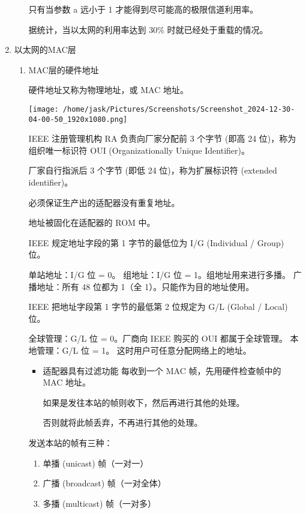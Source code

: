 \documentclass[11pt]{article}
\begin{document}
\begin{enumerate}
\begin{itemize}
只有当参数 a 远小于 1 才能得到尽可能高的极限信道利用率。

据统计，当以太网的利用率达到 30\% 时就已经处于重载的情况。
\end{itemize}
\item 以太网的MAC层
\label{sec:orged552ad}

\begin{enumerate}
\item MAC层的硬件地址
\label{sec:org51e318a}

硬件地址又称为物理地址，或 MAC 地址。 

\begin{center}
\texttt{[image: /home/jask/Pictures/Screenshots/Screenshot\_2024-12-30-04-00-50\_1920x1080.png]}
\end{center}

IEEE 注册管理机构 RA 负责向厂家分配前 3 个字节 (即高 24 位)，称为组织唯一标识符 OUI (Organizationally Unique Identifier)。

厂家自行指派后 3 个字节 (即低 24 位)，称为扩展标识符 (extended identifier)。

必须保证生产出的适配器没有重复地址。

地址被固化在适配器的 ROM 中。

IEEE 规定地址字段的第 1 字节的最低位为 I/G (Individual / Group) 位。

单站地址：I/G 位 = 0。
组地址：I/G 位 = 1。组地址用来进行多播。
广播地址：所有 48 位都为 1（全 1）。只能作为目的地址使用。

IEEE 把地址字段第 1 字节的最低第 2 位规定为 G/L (Global / Local) 位。

全球管理：G/L 位 = 0。厂商向 IEEE 购买的 OUI 都属于全球管理。
本地管理：G/L 位 = 1。 这时用户可任意分配网络上的地址。

\begin{itemize}
\item 适配器具有过滤功能
每收到一个 MAC 帧，先用硬件检查帧中的 MAC 地址。

如果是发往本站的帧则收下，然后再进行其他的处理。

否则就将此帧丢弃，不再进行其他的处理。
\end{itemize}

发送本站的帧有三种：
\begin{enumerate}
\item 单播 (unicast) 帧（一对一）
\item 广播 (broadcast) 帧（一对全体）
\item 多播 (multicast) 帧（一对多）


\end{enumerate}
\end{enumerate}
\end{enumerate}
\end{document}
